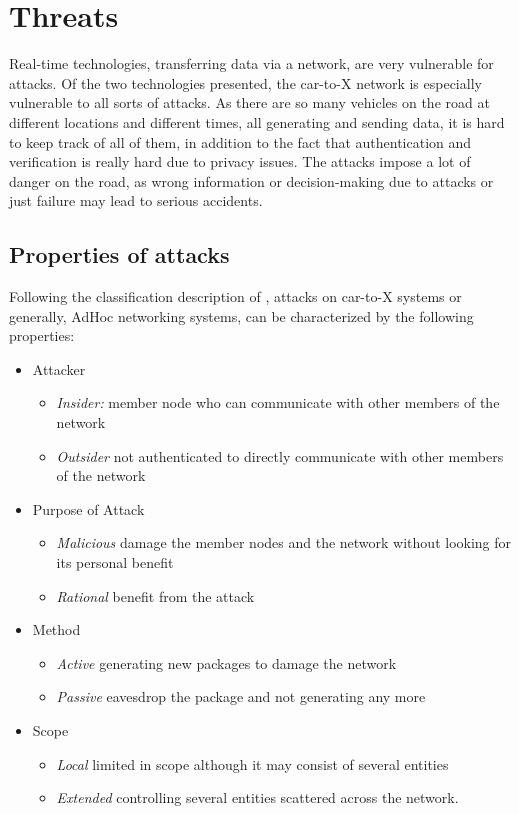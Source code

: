 \section{Threats}
Real-time technologies, transferring data via a network, are very vulnerable for attacks. Of the two technologies presented, the car-to-X network is especially vulnerable to all sorts of attacks. As there are so many vehicles on the road at different locations and different times, all generating and sending data, it is hard to keep track of all of them, in addition to the fact that authentication and verification is really hard due to privacy issues.
The attacks impose a lot of danger on the road, as wrong information or decision-making due to attacks or just failure may lead to serious accidents.
\subsection{Properties of attacks}
Following the classification description of \cite{adhocNetworking}, attacks on car-to-X systems or generally, AdHoc networking systems, can be characterized by the following properties:
\begin{itemize}
\item Attacker
    \begin{itemize}
        \item \textit{Insider:} member node who can communicate with other members of the network
        \item \textit{Outsider} not authenticated to directly communicate with other members of the network
    \end{itemize}
\item {Purpose of Attack}
    \begin{itemize}
        \item \textit{Malicious} damage the member  nodes and the network without looking for its personal benefit
        \item \textit{Rational} benefit from the attack
    \end{itemize}
\item Method
    \begin{itemize}
        \item \textit{Active} generating new packages to damage the network
        \item \textit{Passive} eavesdrop the package and not generating any more
    \end{itemize}
\item Scope
    \begin{itemize}
        \item \textit{Local} limited in scope although it may consist of several entities
        \item \textit{Extended} controlling several entities scattered across the network.
    \end{itemize}
\end{itemize}


